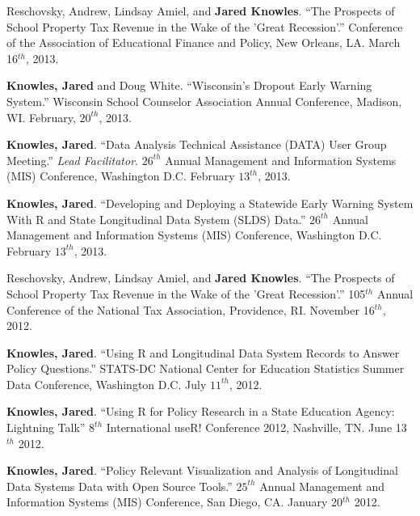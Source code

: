 \documentclass[margin,line]{res}
\begin{document}
\begin{resume}
Reschovsky, Andrew, Lindsay Amiel, and \textbf{Jared Knowles}. ``The Prospects of School Property Tax Revenue in the Wake of the 'Great Recession'.'' Conference of the Association of Educational Finance and Policy, New Orleans, LA. March 16$^{th}$, 2013. 

\textbf{Knowles, Jared} and Doug White. ``Wisconsin's Dropout Early Warning System.'' Wisconsin School Counselor Association Annual Conference, Madison, WI. February, $20^{th}$, 2013. 

\textbf{Knowles, Jared}. ``Data Analysis Technical Assistance (DATA) User Group Meeting.'' \emph{Lead Facilitator}. $26^{th}$ Annual Management and Information Systems (MIS) Conference, Washington D.C. February $13^{th}$, 2013.

\textbf{Knowles, Jared}. ``Developing and Deploying a Statewide Early Warning System With R and State Longitudinal Data System (SLDS) Data.'' $26^{th}$ Annual Management and Information Systems (MIS) Conference, Washington D.C. February $13^{th}$, 2013.

Reschovsky, Andrew, Lindsay Amiel, and \textbf{Jared Knowles}. ``The Prospects of School Property Tax Revenue in the Wake of the 'Great Recession'.'' 105$^{th}$ Annual Conference of the National Tax Association, Providence, RI. November 16$^{th}$, 2012. 

\textbf{Knowles, Jared}. ``Using R and Longitudinal Data System Records to Answer Policy Questions.'' STATS-DC National Center for Education Statistics Summer Data Conference, Washington D.C. July $11^{th}$, 2012.

\textbf{Knowles, Jared}. ``Using R for Policy Research in a State Education Agency: Lightning Talk'' $8^{th}$ International useR! Conference 2012, Nashville, TN. June 13$^{th}$ 2012.

\textbf{Knowles, Jared}. ``Policy Relevant Visualization and Analysis of Longitudinal Data Systems Data with Open Source Tools.'' $25^{th}$ Annual Management and Information Systems (MIS) Conference, San Diego, CA. January 20$^{th}$ 2012.




\end{resume}
\end{document}
